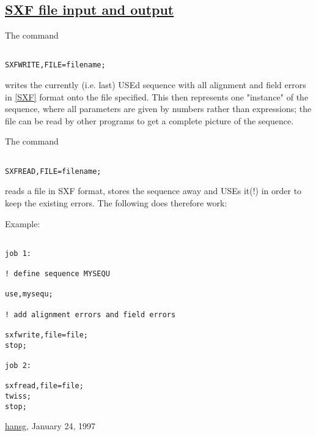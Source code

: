 




\subsection{\href{sxf}{SXF file input and output}} The command 
\begin{verbatim}

SXFWRITE,FILE=filename;
\end{verbatim} writes the currently (i.e. last) USEd sequence with all alignment and field errors in \href{../Introduction/bibliography.html#SXF}{[SXF]} format onto the file specified. This then represents one "instance" of the sequence, where all parameters are given by numbers rather than expressions; the file can be read by other programs to get a complete picture of the sequence. 

 The command 
\begin{verbatim}

SXFREAD,FILE=filename;
\end{verbatim} reads a file in SXF format, stores the sequence away and USEs it(!) in order to keep the existing errors. The following does therefore work: 

 Example: 
\begin{verbatim}

job 1:

! define sequence MYSEQU

use,mysequ;

! add alignment errors and field errors

sxfwrite,file=file;
stop;

job 2:

sxfread,file=file;
twiss;
stop;

\end{verbatim}\href{http://www.cern.ch/Hans.Grote/hansg_sign.html}{hansg}, January 24, 1997 

